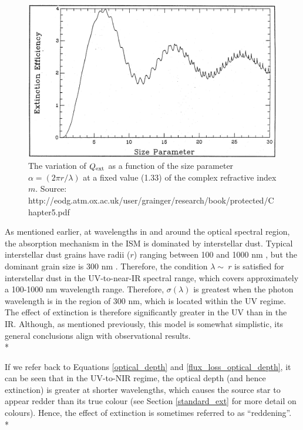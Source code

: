 \documentclass[12pt, a4paper]{report}
\begin{document}
\begin{figure}[h!]
\begin{center}
\includegraphics[width=1.0\textwidth]{grainger_ch5_Qext_vs_wavelength.png}
\caption{The variation of $Q_{\textnormal{ext}}$ as a function of the size parameter $\alpha = (2\pi r/\lambda)$ at a fixed value (1.33) of the complex refractive index $m$. Source: http://eodg.atm.ox.ac.uk/user/grainger/research/book/protected/Chapter5.pdf}
\label{Qlambda_curve}
\end{center}
\end{figure}

As mentioned earlier, at wavelengths in and around the optical spectral region, the absorption mechanism in the ISM is dominated by interstellar dust. Typical interstellar dust grains have radii ($r$) ranging between 100 and 1000 nm \citep{2000JGR...10510299W}, but the dominant grain size is 300 nm \citep{2003JGRA..108.8030L}. Therefore, the condition $\lambda \sim\ r$ is satisfied for interstellar dust in the UV-to-near-IR spectral range, which covers approximately a 100-1000 nm wavelength range. Therefore, $\sigma(\lambda)$ is greatest when the photon wavelength is in the region of 300 nm, which is located within the UV regime. The effect of extinction is therefore significantly greater in the UV than in the IR. Although, as mentioned previously, this model is somewhat simplistic, its general conclusions align with observational results.\\*

If we refer back to Equations \ref{optical_depth} and \ref{flux_loss_optical_depth}, it can be seen that in the UV-to-NIR regime, the optical depth (and hence extinction) is greater at shorter wavelengths,  which causes the source star to appear redder than its true colour (see Section \ref{standard_ext} for more detail on colours). Hence, the effect of extinction is sometimes referred to as ``reddening''. \\*
\end{document}
